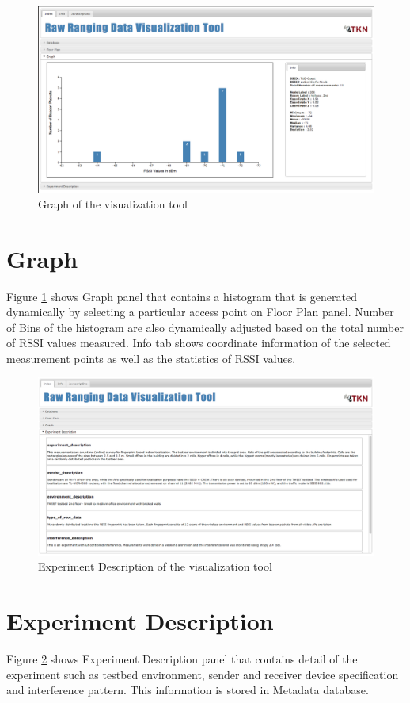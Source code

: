 \documentclass[11pt,a4paper,headinclude,footinclude,chapterprefix=on]{scrreprt}
\begin{document}
\begin{figure}
	[!h] \centering 
	\includegraphics[width=15cm]{Images/tool_graph.png} \caption{Graph of the visualization tool} \label{fig:tool:graph} 
\end{figure}

\section{Graph} 
Figure \ref{fig:tool:graph} shows Graph panel that contains a histogram that is generated dynamically by selecting a particular access point on Floor Plan panel. Number of Bins of the histogram are also dynamically adjusted based on the total number of RSSI values measured. Info tab shows coordinate information of the selected measurement points as well as the statistics of RSSI values.

\begin{figure}
	[!h] \centering 
	\includegraphics[width=15cm]{Images/tool_des.png} \caption{Experiment Description of the visualization tool} \label{fig:tool:des} 
\end{figure}

\section{Experiment Description} 
Figure \ref{fig:tool:des} shows Experiment Description panel that contains detail of the experiment such as testbed environment, sender and receiver device specification and interference pattern. This information is stored in Metadata database. 
\end{document}
